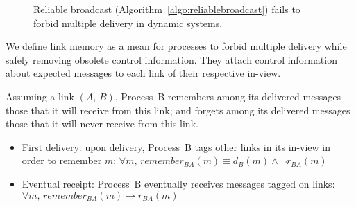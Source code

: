 \begin{figure*}
  \begin{center}
    \hspace{30pt}
    \hspace{30pt}
    \hspace{30pt}
    \caption{\label{fig:memorylinkfails}Reliable broadcast
      (Algorithm~\ref{algo:reliablebroadcast}) fails to forbid multiple delivery
      in dynamic systems. }
  \end{center}
\end{figure*}





We define link memory as a mean for processes to forbid multiple delivery
while safely removing obsolete control information. They attach control
information about expected messages to each link of their respective in-view.


\begin{definition}
  Assuming a link $(A,\, B)$, Process~B remembers among its delivered messages
  those that it will receive from this link; and forgets among its delivered
  messages those that it will never receive from this link.
  \begin{itemize}
  \item \small First delivery: upon delivery, Process~B tags other links in its
    in-view in order to remember $m$:
    $\forall m,\, remember_{BA}(m) \equiv d_B(m) \wedge \neg r_{BA}(m)$
  \item Eventual receipt: Process~B eventually receives messages tagged on links:
    $\forall m,\, remember_{BA}(m) \rightarrow r_{BA}(m)$
  \end{itemize}
\end{definition}

